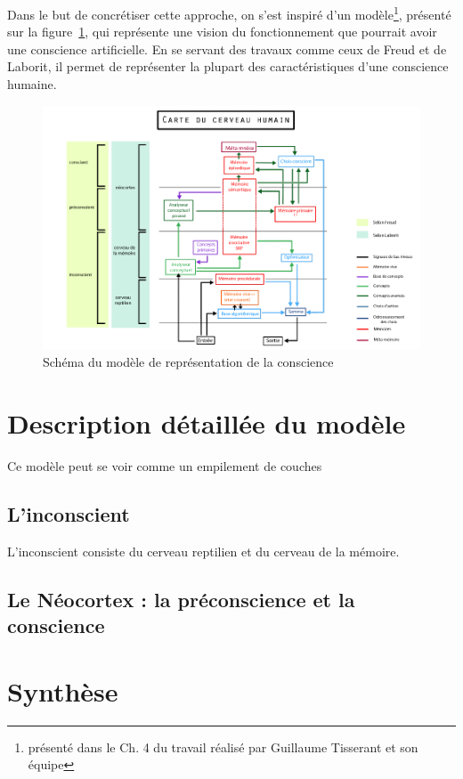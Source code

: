 Dans le but de concrétiser cette approche, on
s'est inspiré d'un modèle\footnote{présenté dans le Ch. 4 du travail réalisé par
\mbox{Guillaume} \mbox{Tisserant} et son équipe}, présenté sur la
figure~\ref{modele_original}, qui représente une vision du fonctionnement que
pourrait avoir une conscience artificielle. En se servant des travaux comme ceux
de Freud et de Laborit, il permet de représenter la plupart des caractéristiques
d’une conscience humaine.

\begin{figure}[H] 
\centering
\includegraphics[width=\textwidth]{files/modele_original} 
\caption{Schéma du modèle de représentation de la conscience} 
\label{modele_original}
\end{figure}

\section{Description détaillée du modèle}
Ce modèle peut se voir comme un empilement de couches
\subsection{L’inconscient}
L'inconscient consiste du cerveau reptilien et du cerveau de la mémoire.
\subsection{Le Néocortex : la préconscience et la conscience}

\section{Synthèse}
